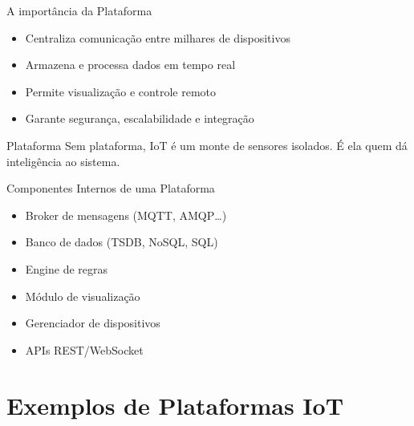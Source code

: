 \documentclass[aspectratio=169,xcolor=dvipsnames]{beamer}
\begin{document}
\begin{frame}{A importância da Plataforma}
\begin{itemize}
    \item Centraliza comunicação entre milhares de dispositivos
    \item Armazena e processa dados em tempo real
    \item Permite visualização e controle remoto
    \item Garante segurança, escalabilidade e integração
\end{itemize}
\begin{alertblock}{Plataforma}
Sem plataforma, IoT é um monte de sensores isolados. É ela quem dá inteligência ao sistema.\end{alertblock}
\end{frame}

\begin{frame}{Componentes Internos de uma Plataforma}
\begin{itemize}
    \item Broker de mensagens (MQTT, AMQP…)
    \item Banco de dados (TSDB, NoSQL, SQL)
    \item Engine de regras
    \item Módulo de visualização
    \item Gerenciador de dispositivos
    \item APIs REST/WebSocket
\end{itemize}
\end{frame}

\section{Exemplos de Plataformas IoT}
\end{document}
